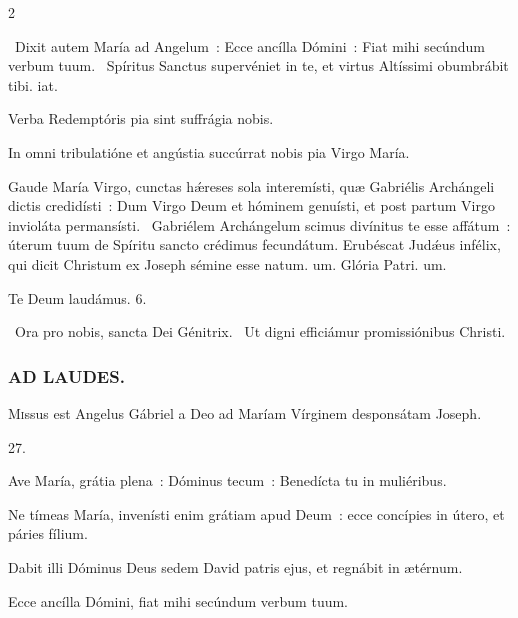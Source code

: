 \documentclass[9pt,twoside]{extarticle}
\begin{document}
\begin{multicols}{2}
{{\begin{tightlist}{}
\item {}~Dixit autem María ad Angelum~: Ecce ancílla Dómini~: \textred{*} Fiat mihi secúndum verbum tuum. ~Spíritus Sanctus supervéniet in te, et virtus Altíssimi obumbrábit tibi. iat.
\item {} Verba Redemptóris pia sint suffrágia nobis.
\item {} In omni tribulatióne et angústia succúrrat nobis pia Virgo María.
\item {} Gaude María Virgo, cunctas hǽreses sola interemísti, quæ Gabriélis Archángeli dictis credidísti~: \textred{*} Dum Virgo Deum et hóminem genuísti, et post partum Virgo invioláta permansísti. ~Gabriélem Archángelum scimus divínitus te esse affátum~: úterum tuum de Spíritu sancto crédimus fecundátum. Erubéscat Judǽus infélix, qui dicit Christum ex Joseph sémine esse natum. um. Glória Patri. um.
\item Te Deum laudámus. 6.
\item {}~Ora pro nobis, sancta Dei Génitrix. ~Ut digni efficiámur promissiónibus Christi.
\end{tightlist}

\subsubsection*{\center \textsc{AD LAUDES.}}
\begin{center}\end{center}
\lettrine{M}issus est Angelus Gábriel a Deo ad Maríam Vírginem desponsátam Joseph.

\begin{tightlist}{}
\item {} 27.
\item {} Ave María, grátia plena~: Dóminus tecum~: Benedícta tu in muliéribus.
\item {} Ne tímeas María, invenísti enim grátiam apud Deum~: ecce concípies in útero, et páries fílium.
\item {} Dabit illi Dóminus Deus sedem David patris ejus, et regnábit in ætérnum.
\item {} Ecce ancílla Dómini, fiat mihi secúndum verbum tuum.
\end{tightlist}

}}
\end{multicols}
\end{document}
